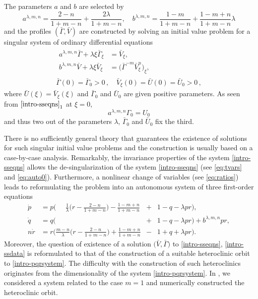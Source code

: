 \documentclass[a4paper,11pt]{article}
\def\bG{\bar{\Gamma}}
\def\bV{\bar{V}}
\def\bU{\bar{U}}
\numberwithin{step}{dummy}
\begin{document}
The parameters $a$ and $b$ are selected by
\begin{equation}
\label{defab}
 a^{\lambda,m,n}= \frac{2-n}{1+m-n} + \frac{2 \lambda}{1+m-n}, \quad b^{\lambda,m,n}= \frac{1-m}{1+m-n} + \frac{1-m+n}{1+m-n} \lambda
\end{equation}
and the profiles $(\bG, \bV)$ are constructed by solving an initial value problem for a singular system of ordinary differential equations
\begin{align} 
\label{intro-sseqns}
\begin{aligned}
 a^{\lambda,m,n}\bG + \lambda \xi \bG_\xi &= \bV_\xi,\\
 b^{\lambda,m,n}\bV + \lambda \xi \bV_\xi &= \big(\bG^{-m}\bV_\xi^n\big)_\xi,
\end{aligned}
\\
\label{intro-ssdata}
 \bG(0) = \bG_0  > 0 \, , \quad \bV_{\xi} (0)  = \bU(0) = \bU_0  > 0 \, , 
 \end{align}
where  $\bU(\xi) = \bV_\xi(\xi)$ and $\bG_0$ and $\bU_0$ are given positive parameters. As seen from $\eqref{intro-sseqns}_1$ at $\xi=0$, 
$$
 a^{\lambda,m,n} \Gamma_0 = U_0
 $$
and thus  two out of the parameters $\lambda$, $\bG_0$ and $\bU_0$ fix the third. 


There is no sufficiently general theory that guarantees the existence of solutions for such singular initial value problems and the construction is
usually based on a case-by-case analysis.
Remarkably, the invariance properties of the system \eqref{intro-sseqns} allows the  de-singularization of the system \eqref{intro-sseqns}
(see \eqref{eq:tvars} and \eqref{eq:auto0}). Furthermore, a nonlinear change of variables (see \eqref{eq:ratios}) leads to reformulating the problem
into an autonomous system of three first-order equations
{\small
\begin{align} 
 \dot{p} &=p\Big( ~~~~~~\frac{1}{ \lambda }\big(r - \frac{2-n}{1+m-n}\big) - \frac{1-m+n}{1+m-n} &+&1-q- \lambda p r\Big), \nonumber \\
 \dot{q} &=q\Big(                                                                          &+&1-q- \lambda p r\Big) + b^{\lambda,m,n}pr,\label{intro-pqrsystem}\\%
 n\dot{r}&=r\Big( \frac{m-n}{ \lambda }\big(r - \frac{2-n}{1+m-n}\big) + \frac{1-m+n}{1+m-n} &-&1+q+ \lambda p r\Big). \nonumber
\end{align}}
Moreover, the question of existence of a solution $\big(\bV,\bG)$ to \eqref{intro-sseqns}, \eqref{intro-ssdata} is reformulated 
to that of the construction of a suitable heteroclinic orbit to \eqref{intro-pqrsystem}. The difficulty with the construction of
such heteroclinics originates from the dimensionality of the system \eqref{intro-pqrsystem}.
In \cite{KLT_2016},  we considered a system related to the case $m=1$ and numerically constructed  the heteroclinic orbit.
\end{document}
